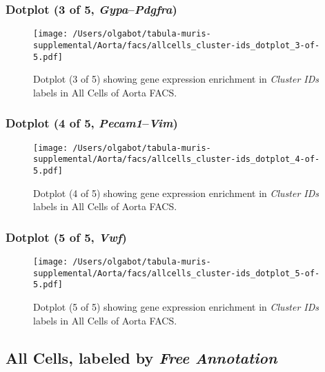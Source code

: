 \clearpage

\subsubsection{Dotplot (3 of 5, \emph{Gypa}--\emph{Pdgfra})}
\begin{figure}[h]
\centering
\texttt{[image: /Users/olgabot/tabula-muris-supplemental/Aorta/facs/allcells\_cluster-ids\_dotplot\_3-of-5.pdf]}

\caption{ Dotplot (3 of 5)  showing gene expression enrichment in \emph{Cluster IDs} labels in All Cells of Aorta FACS. }
\end{figure}


\clearpage

\subsubsection{Dotplot (4 of 5, \emph{Pecam1}--\emph{Vim})}
\begin{figure}[h]
\centering
\texttt{[image: /Users/olgabot/tabula-muris-supplemental/Aorta/facs/allcells\_cluster-ids\_dotplot\_4-of-5.pdf]}

\caption{ Dotplot (4 of 5)  showing gene expression enrichment in \emph{Cluster IDs} labels in All Cells of Aorta FACS. }
\end{figure}


\clearpage

\subsubsection{Dotplot (5 of 5, \emph{Vwf})}
\begin{figure}[h]
\centering
\texttt{[image: /Users/olgabot/tabula-muris-supplemental/Aorta/facs/allcells\_cluster-ids\_dotplot\_5-of-5.pdf]}

\caption{ Dotplot (5 of 5)  showing gene expression enrichment in \emph{Cluster IDs} labels in All Cells of Aorta FACS. }
\end{figure}


\clearpage

\subsection{All Cells, labeled by \emph{Free Annotation}}
